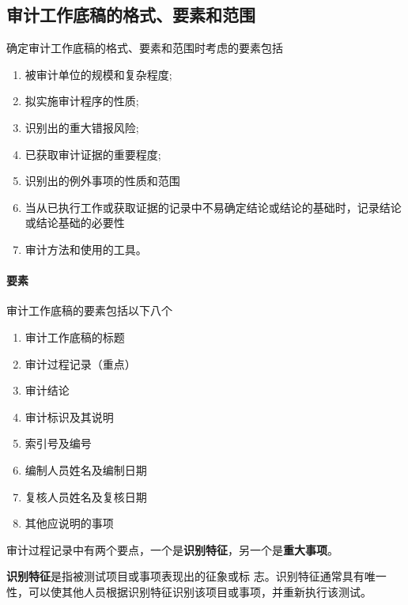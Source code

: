 \documentclass[UTF8,12pt]{ctexart}
\numberwithin{equation}{section} %
\numberwithin{figure}{section}
\numberwithin{table}{section}
\begin{document}
	\subsection{审计工作底稿的格式、要素和范围}
	确定审计工作底稿的格式、要素和范围时考虑的要素包括
	\begin{enumerate}
		\item 被审计单位的规模和复杂程度;
		
		\item 拟实施审计程序的性质;
		
		\item 识别出的重大错报风险;
		
		\item 已获取审计证据的重要程度;
		
		\item 识别出的例外事项的性质和范围
		
		\item 当从已执行工作或获取证据的记录中不易确定结论或结论的基础时，记录结论或结论基础的必要性
		
		\item 审计方法和使用的工具。
	\end{enumerate}
	
	\paragraph{要素}审计工作底稿的要素包括以下八个
	\begin{enumerate}
		\item 审计工作底稿的标题
		
		\item 审计过程记录（重点）
		
		\item 审计结论
		
		\item 审计标识及其说明
		
		\item 索引号及编号
		
		\item 编制人员姓名及编制日期
		
		\item 复核人员姓名及复核日期
		
		\item 其他应说明的事项
	\end{enumerate}
	
	审计过程记录中有两个要点，一个是\textbf{识别特征}，另一个是\textbf{重大事项}。
	
	\textbf{识别特征}是指被测试项目或事项表现出的征象或标 志。识别特征通常具有唯一性，可以使其他人员根据识别特征识别该项目或事项，并重新执行该测试。
	
\end{document}
